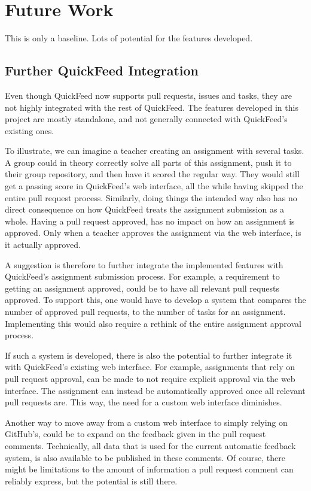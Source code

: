 \chapter{Future Work}

This is only a baseline.
Lots of potential for the features developed.

\section{Further QuickFeed Integration}

Even though QuickFeed now supports pull requests, issues and tasks, they are not highly integrated with the rest of QuickFeed.
The features developed in this project are mostly standalone, and not generally connected with QuickFeed's existing ones.

To illustrate, we can imagine a teacher creating an assignment with several tasks.
A group could in theory correctly solve all parts of this assignment, push it to their group repository, and then have it scored the regular way.
They would still get a passing score in QuickFeed's web interface, all the while having skipped the entire pull request process.
Similarly, doing things the intended way also has no direct consequence on how QuickFeed treats the assignment submission as a whole.
Having a pull request approved, has no impact on how an assignment is approved.
Only when a teacher approves the assignment via the web interface, is it actually approved.

A suggestion is therefore to further integrate the implemented features with QuickFeed's assignment submission process.
For example, a requirement to getting an assignment approved, could be to have all relevant pull requests approved.
To support this, one would have to develop a system that compares the number of approved pull requests, to the number of tasks for an assignment.
Implementing this would also require a rethink of the entire assignment approval process.

If such a system is developed, there is also the potential to further integrate it with QuickFeed's existing web interface.
For example, assignments that rely on pull request approval, can be made to not require explicit approval via the web interface.
The assignment can instead be automatically approved once all relevant pull requests are.
This way, the need for a custom web interface diminishes.

Another way to move away from a custom web interface to simply relying on GitHub's, could be to expand on the feedback given in the pull request comments.
Technically, all data that is used for the current automatic feedback system, is also available to be published in these comments.
Of course, there might be limitations to the amount of information a pull request comment can reliably express, but the potential is still there.

